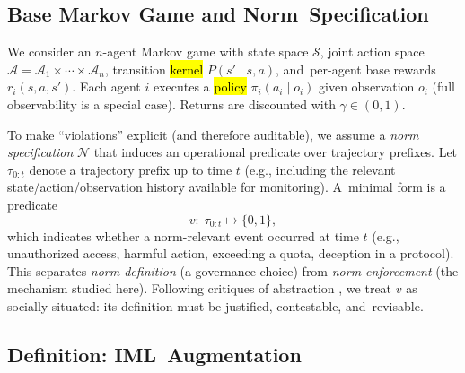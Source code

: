 \documentclass[mca,article,accept,pdftex,oneauthor]{Definitions/mdpi}
\begin{document}
\subsection{Base Markov Game and Norm~Specification}
\label{sec:mg_norms}

We consider an $n$-agent Markov game with state space $\mathcal{S}$, joint action space \mbox{$\mathcal{A}=\mathcal{A}_1\times\cdots\times\mathcal{A}_n$,} transition \hl{kernel} %
 $P(s'\mid s,a)$, and~per-agent base rewards $r_i(s,a,s')$. Each agent $i$ executes a \hl{policy} $\pi_i(a_i\mid o_i)$ given observation $o_i$ (full observability is a special case). Returns are discounted with $\gamma\in(0,1)$.

To make ``violations'' explicit (and therefore auditable), we assume a \emph{norm specification} $\mathcal{N}$ that induces an operational predicate over trajectory prefixes. Let $\tau_{0:t}$ denote a trajectory prefix up to time $t$ (e.g., including the relevant state/action/observation history available for monitoring). A~minimal form is a predicate
\[
  v:\; \tau_{0:t}\mapsto \{0,1\},
\]
which indicates whether a norm-relevant event occurred at time $t$ (e.g., unauthorized access, harmful action, exceeding a quota, deception in a protocol). This separates \emph{norm definition} (a governance choice) from \emph{norm enforcement} (the mechanism studied here). Following critiques of abstraction \citep{Selbst2019FairnessAbstraction}, we treat $v$ as socially situated: its definition must be justified, contestable, and~revisable.


\subsection{Definition: IML~Augmentation}
\label{sec:iml_def}
\end{document}
